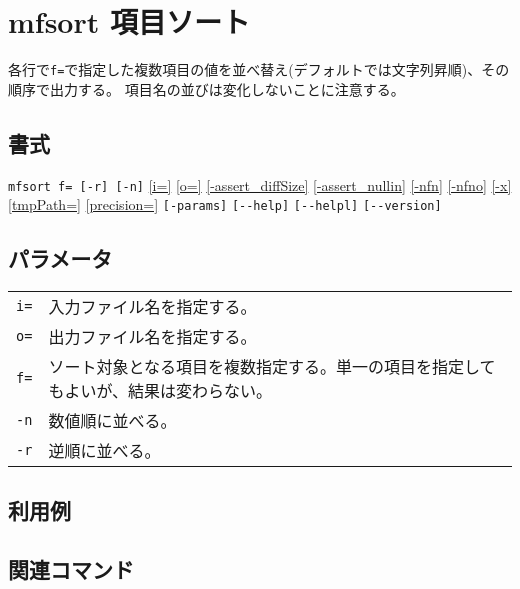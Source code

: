 
%

\section{mfsort 項目ソート\label{sect:mfsort}}
各行で\verb|f=|で指定した複数項目の値を並べ替え(デフォルトでは文字列昇順)、その順序で出力する。
項目名の並びは変化しないことに注意する。

\subsection*{書式}
\verb|mfsort f= [-r] [-n]| 
\hyperref[sect:option_i]{[i=]}
\hyperref[sect:option_o]{[o=]}
\hyperref[sect:option_assert_diffSize]{[-assert\_diffSize]}
\hyperref[sect:option_assert_nullin]{[-assert\_nullin]}
\hyperref[sect:option_nfn]{[-nfn]} 
\hyperref[sect:option_nfno]{[-nfno]}  
\hyperref[sect:option_x]{[-x]}
\hyperref[sect:option_option_tmppath]{[tmpPath=]}
\hyperref[sect:option_precision]{[precision=]}
\verb|[-params]|
\verb|[--help]|
\verb|[--helpl]|
\verb|[--version]|\\

\subsection*{パラメータ}
\begin{table}[htbp]
{\small
\begin{tabular}{ll}
\verb|i=|    & 入力ファイル名を指定する。\\
\verb|o=|    & 出力ファイル名を指定する。\\
\verb|f=| & ソート対象となる項目を複数指定する。単一の項目を指定してもよいが、結果は変わらない。\\
\verb|-n| & 数値順に並べる。\\
\verb|-r| & 逆順に並べる。\\
\end{tabular} 
}
\end{table} 

\subsection*{利用例}


\subsection*{関連コマンド}

%
